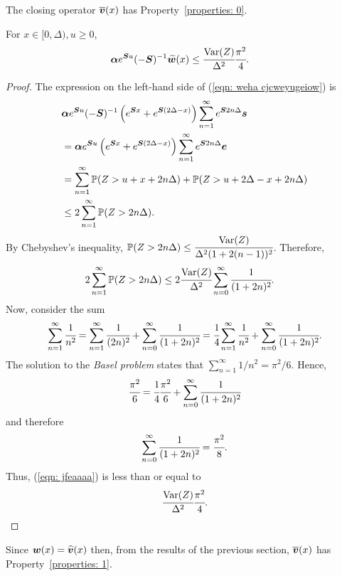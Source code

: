 \begin{lem}\label{lem: akxnj2}
	The closing operator \(\overline{\boldsymbol v}(x)\) has Property~\ref{properties: 0}.

	For \(x\in[0,\Delta),u\geq 0\),  
        \begin{align}
        		\boldsymbol \alpha   e^{\boldsymbol Su}(-\boldsymbol S)^{-1} \widetilde{\boldsymbol w}(x) &\leq \cfrac{\mathrm{Var}(Z)}{\Delta^2}\cfrac{\pi^2}{4}.\label{eqn: weha cjcweyugeiow}
	\end{align}
\end{lem}
\begin{proof}
	The expression on the left-hand side of (\ref{eqn: weha cjcweyugeiow}) is 
	\begin{align*}
		&\boldsymbol \alpha e^{\boldsymbol Su}(-\boldsymbol S)^{-1} \left(e^{\boldsymbol{S} x} + e^{\boldsymbol{S} (2\Delta-x)}\right)\sum_{n=1}^\infty e^{\boldsymbol S  2n\Delta} \boldsymbol s
		\\&= \boldsymbol \alpha e^{\boldsymbol Su} \left(e^{\boldsymbol{S} x} + e^{\boldsymbol{S} (2\Delta-x)}\right)\sum_{n=1}^\infty e^{\boldsymbol S  2n\Delta} \boldsymbol e
		\\&=\sum_{n=1}^\infty \mathbb P(Z>u+x+2n\Delta) + \mathbb P(Z>u+2\Delta-x+2n\Delta)
		\\&\leq 2 \sum_{n=1}^\infty \mathbb P(Z>2n\Delta).
	\end{align*}
	By Chebyshev's inequality, \(\mathbb P(Z>2n\Delta)\leq \cfrac{\mathrm{Var}(Z)}{\Delta^2(1+2(n-1))^2}\). Therefore,
	\begin{align}
		2 \sum_{n=1}^\infty \mathbb P(Z>2n\Delta)
		& \leq 2 \cfrac{\mathrm{Var}(Z)}{\Delta^2} \sum_{n=0}^\infty \cfrac{1}{(1+2n)^2}. \label{eqn: jfeaaaa}
	\end{align}
	Now, consider the sum 
	\begin{align}
		\sum_{n=1}^\infty \cfrac{1}{n^2} = \sum_{n=1}^\infty \cfrac{1}{(2n)^2} + \sum_{n=0}^\infty \cfrac{1}{(1+2n)^2} = \cfrac{1}{4}\sum_{n=1}^\infty \cfrac{1}{n^2} + \sum_{n=0}^\infty \cfrac{1}{(1+2n)^2}.
	\end{align}
	The solution to the \emph{Basel problem} states that \(\displaystyle\sum_{n=1}^\infty 1/n^2=\pi^2/6.\) Hence, 
	\[\cfrac{\pi^2}{6} = \cfrac{1}{4}\cfrac{\pi^2}{6} + \sum_{n=0}^\infty \cfrac{1}{(1+2n)^2}\]
	and therefore 
	\[\sum_{n=0}^\infty \cfrac{1}{(1+2n)^2} = \cfrac{\pi^2}{8}.\]
	Thus, (\ref{eqn: jfeaaaa}) is less than or equal to 
	\[\cfrac{\mathrm{Var}(Z)}{\Delta^2}\cfrac{\pi^2}{4}.\]
\end{proof}

Since \(\boldsymbol w(x)=\widehat{\boldsymbol v}(x)\) then, from the results of the previous section, \(\overline{\boldsymbol v}(x)\) has Property~\ref{properties: 1}.

